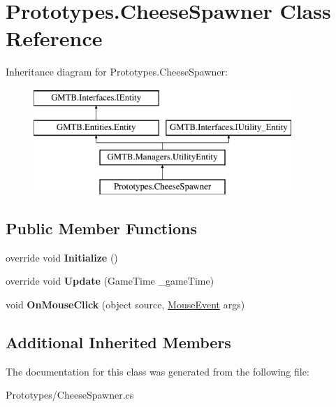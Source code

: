 \hypertarget{class_prototypes_1_1_cheese_spawner}{}\section{Prototypes.\+Cheese\+Spawner Class Reference}
\label{class_prototypes_1_1_cheese_spawner}
Inheritance diagram for Prototypes.\+Cheese\+Spawner\+:\begin{figure}[H]
\begin{center}
\leavevmode
\includegraphics[height=4.000000cm]{class_prototypes_1_1_cheese_spawner}
\end{center}
\end{figure}
\subsection*{Public Member Functions}
\begin{DoxyCompactItemize}
\item 
\mbox{\label{class_prototypes_1_1_cheese_spawner_a4c63bbe8c5896c2be79ee27f7ecb7dfd}} 
override void {\bfseries Initialize} ()
\item 
\mbox{\label{class_prototypes_1_1_cheese_spawner_a7fc26037f12221661190fada09c431f5}} 
override void {\bfseries Update} (Game\+Time \+\_\+game\+Time)
\item 
\mbox{\label{class_prototypes_1_1_cheese_spawner_a79373776eb599c8540d33bd2be84158c}} 
void {\bfseries On\+Mouse\+Click} (object source, \mbox{\hyperlink{class_g_m_t_b_1_1_input_system_1_1_mouse_event}{Mouse\+Event}} args)
\end{DoxyCompactItemize}
\subsection*{Additional Inherited Members}


The documentation for this class was generated from the following file\+:\begin{DoxyCompactItemize}
\item 
Prototypes/Cheese\+Spawner.\+cs\end{DoxyCompactItemize}
